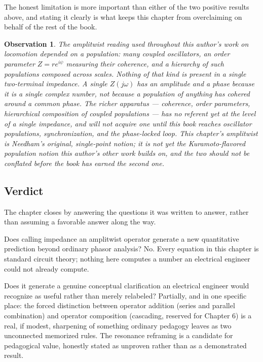 \documentclass[12pt]{article}
\newtheorem{observation}{Observation}
\begin{document}
The honest limitation is more important than either of the two positive results above, and stating it clearly is what keeps this chapter from overclaiming on behalf of the rest of the book.

\begin{observation}
The amplitwist reading used throughout this author's work on locomotion depended on a population: many coupled oscillators, an order parameter $Z = re^{i\psi}$ measuring their coherence, and a hierarchy of such populations composed across scales. Nothing of that kind is present in a single two-terminal impedance. A single $Z(j\omega)$ has an amplitude and a phase because it is a single complex number, not because a population of anything has cohered around a common phase. The richer apparatus — coherence, order parameters, hierarchical composition of coupled populations — has no referent yet at the level of a single impedance, and will not acquire one until this book reaches oscillator populations, synchronization, and the phase-locked loop. This chapter's amplitwist is Needham's original, single-point notion; it is not yet the Kuramoto-flavored population notion this author's other work builds on, and the two should not be conflated before the book has earned the second one.
\end{observation}

\subsection{Verdict}

The chapter closes by answering the questions it was written to answer, rather than assuming a favorable answer along the way.

Does calling impedance an amplitwist operator generate a new quantitative prediction beyond ordinary phasor analysis? No. Every equation in this chapter is standard circuit theory; nothing here computes a number an electrical engineer could not already compute.

Does it generate a genuine conceptual clarification an electrical engineer would recognize as useful rather than merely relabeled? Partially, and in one specific place: the forced distinction between operator addition (series and parallel combination) and operator composition (cascading, reserved for Chapter 6) is a real, if modest, sharpening of something ordinary pedagogy leaves as two unconnected memorized rules. The resonance reframing is a candidate for pedagogical value, honestly stated as unproven rather than as a demonstrated result.
\end{document}

